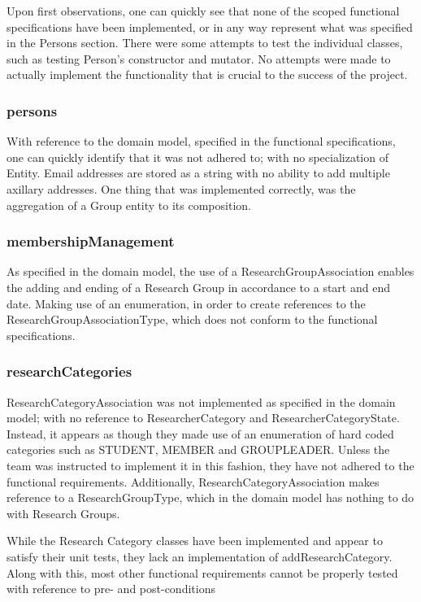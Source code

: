 \documentclass{article}
\begin{document}
Upon first observations, one can quickly see that none of the scoped functional specifications have been implemented, or in any way represent what was specified in the Persons section. There were some attempts to test the individual classes, such as testing Person's constructor and mutator. No attempts were made to actually implement the functionality that is crucial to the success of the project.

\subsubsection{persons}
With reference to the domain model, specified in the functional specifications, one can quickly identify that it was not adhered to; with no specialization of Entity. Email addresses are stored as a string with no ability to add multiple axillary addresses. One thing that was implemented correctly, was the aggregation of a Group entity to its composition.

\subsubsection{membershipManagement}
As specified in the domain model, the use of a ResearchGroupAssociation enables the adding and ending of a Research Group in accordance to a start and end date. Making use of an enumeration, in order to create references to the ResearchGroupAssociationType, which does not conform to the functional specifications. 

\subsubsection{researchCategories}
ResearchCategoryAssociation was not implemented as specified in the domain model; with no reference to ResearcherCategory and ResearcherCategoryState. Instead, it appears as though they made use of an enumeration of hard coded categories such as STUDENT, MEMBER and GROUPLEADER. Unless the team was instructed to implement it in this fashion, they have not adhered to the functional requirements. Additionally, ResearchCategoryAssociation makes reference to a ResearchGroupType, which in the domain model has nothing to do with Research Groups.

While the Research Category classes have been implemented and appear to satisfy their unit tests, they lack an implementation of addResearchCategory. Along with this, most other functional requirements cannot be properly tested with reference to pre- and post-conditions
\end{document}

